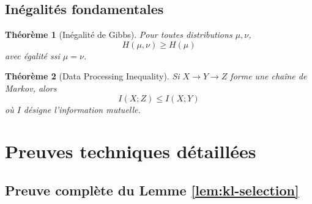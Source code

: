 \documentclass[12pt,a4paper]{article}
\newtheorem{theorem}{Théorème}[section]
\theoremstyle{definition}
\theoremstyle{remark}
\begin{document}
\subsection{Inégalités fondamentales}

\begin{theorem}[Inégalité de Gibbs]\label{thm:gibbs}
Pour toutes distributions $\mu, \nu$,
\begin{equation}
	H(\mu, \nu) \geq H(\mu)
\end{equation}
avec égalité ssi $\mu = \nu$.
\end{theorem}

\begin{theorem}[Data Processing Inequality]\label{thm:dpi}
Si $X \to Y \to Z$ forme une chaîne de Markov, alors
\begin{equation}
	I(X; Z) \leq I(X; Y)
\end{equation}
où $I$ désigne l'information mutuelle.
\end{theorem}

\section{Preuves techniques détaillées}

\subsection{Preuve complète du Lemme \ref{lem:kl-selection}}
\end{document}
